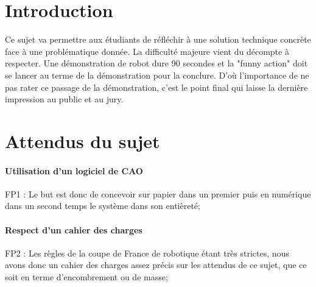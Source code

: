 \documentclass[fleqn,10pt]{SelfArx} %
\begin{document}
\flushbottom %

\maketitle %

\tableofcontents %

\thispagestyle{empty} %


\section*{Introduction} %


Ce sujet va permettre aux étudiants de réfléchir à une solution technique concrète face à une problématique donnée. La difficulté majeure vient du décompte à respecter. Une démonstration de robot dure 90 secondes et la "funny action" doit se lancer au terme de la démonstration pour la conclure. D'où l'importance de ne pas rater ce passage de la démonstration, c'est le point final qui laisse la dernière impression au public et au jury.



\section{Attendus du sujet}

\paragraph{Utilisation d’un logiciel de CAO}
FP1 : Le but est donc de concevoir sur papier dans un premier puis en numérique dans un second temps le système dans son entièreté;
\paragraph{Respect d’un cahier des charges}
FP2 : Les règles de la coupe de France de robotique étant très strictes, nous avons donc un cahier des charges assez précis sur les attendus de ce sujet, que ce soit en terme d'encombrement ou de masse;
\end{document}
